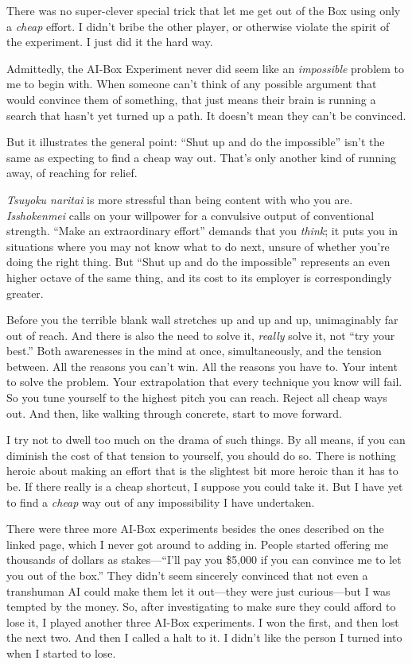 {
 There was no super-clever special trick that let me get out of the
Box using only a \textit{cheap} effort. I didn't bribe
the other player, or otherwise violate the spirit of the experiment. I
just did it the hard way.}

{
 Admittedly, the AI-Box Experiment never did seem like an
\textit{impossible} problem to me to begin with. When someone
can't think of any possible argument that would
convince them of something, that just means their brain is running a
search that hasn't yet turned up a path. It
doesn't mean they can't be convinced.}

{
 But it illustrates the general point: ``Shut up
and do the impossible'' isn't the
same as expecting to find a cheap way out. That's only
another kind of running away, of reaching for relief.}

{
 \textit{Tsuyoku naritai} is more stressful than being content with
who you are. \textit{Isshokenmei} calls on your willpower for a
convulsive output of conventional strength. ``Make an
extraordinary effort'' demands that you
\textit{think}; it puts you in situations where you may not know what
to do next, unsure of whether you're doing the right
thing. But ``Shut up and do the
impossible'' represents an even higher octave of the
same thing, and its cost to its employer is correspondingly greater.}

{
 Before you the terrible blank wall stretches up and up and up,
unimaginably far out of reach. And there is also the need to solve it,
\textit{really} solve it, not ``try your
best.'' Both awarenesses in the mind at once,
simultaneously, and the tension between. All the reasons you
can't win. All the reasons you have to. Your intent to
solve the problem. Your extrapolation that every technique you know
will fail. So you tune yourself to the highest pitch you can reach.
Reject all cheap ways out. And then, like walking through concrete,
start to move forward.}

{
 I try not to dwell too much on the drama of such things. By all
means, if you can diminish the cost of that tension to yourself, you
should do so. There is nothing heroic about making an effort that is
the slightest bit more heroic than it has to be. If there really is a
cheap shortcut, I suppose you could take it. But I have yet to find a
\textit{cheap} way out of any impossibility I have undertaken.}

{
 There were three more AI-Box experiments besides the ones
described on the linked page, which I never got around to adding in.
People started offering me thousands of dollars as
stakes---``I'll pay you \$5,000 if you
can convince me to let you out of the box.'' They
didn't seem sincerely convinced that not even a
transhuman AI could make them let it out---they were just curious---but
I was tempted by the money. So, after investigating to make sure they
could afford to lose it, I played another three AI-Box experiments. I
won the first, and then lost the next two. And then I called a halt to
it. I didn't like the person I turned into when I
started to lose.}

